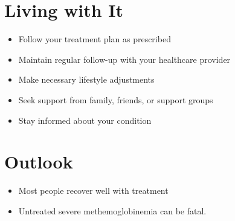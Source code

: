 \section{Living with It}
\begin{itemize}[noitemsep]
  \item Follow your treatment plan as prescribed
  \item Maintain regular follow-up with your healthcare provider
  \item Make necessary lifestyle adjustments
  \item Seek support from family, friends, or support groups
  \item Stay informed about your condition
\end{itemize}
\section{Outlook}
\begin{itemize}[noitemsep]
  \item Most people recover well with treatment
  \item Untreated severe methemoglobinemia can be fatal.
\end{itemize}
